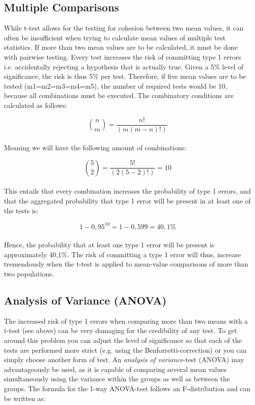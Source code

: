 \subsection{Multiple Comparisons}
While t-test allows for the testing for cohesion between two mean values, it can often be insufficient when trying to calculate mean values of multiple test statistics. If more than two mean values are to be calculated, it must be done with pairwise testing. Every test increases the risk of committing type 1 errors i.e. accidentally rejecting a hypothesis that is actually true. Given a 5\% level of significance, the risk is thus 5\% per test. Therefore, if five mean values are to be tested (m1=m2=m3=m4=m5), the number of required tests would be 10, because all combinations must be executed. The combinatory conditions are calculated as follows:

\begin{equation}
\binom{n}{m} = {\frac{n!}{(m(m-n)!)}} 
\end{equation}\\
Meaning we will have the following amount of combinations:

\begin{equation}
\binom{5}{2} = {\frac{5!}{(2(5-2)!)}} = 10 
\end{equation}\\
This entails that every combination increases the probability of type 1 errors, and that the aggregated probability that type 1 error will be present in at least one of the tests is:

\begin{equation}
1-0,95^{10}= 1-0,599 = 40,1\%
\end{equation}\\
Hence, the probability  that at least one type 1 error will be present is approximately 40,1\%. The risk of committing a type 1 error will thus, increase tremendously when the t-test is applied to mean-value comparisons of more than two populations.
\\

\subsection{Analysis of Variance (ANOVA)}
The increased risk of type 1 errors when comparing more than two means with a t-test (see above) can be very damaging for the credibility of any test. To get around this problem you can adjust the level of significance so that each of the tests are performed more strict (e.g. using the Benforretti-correction) or you can simply choose another form of test. An \textit{analysis of variance}-test (ANOVA) may advantageously be used, as it is capable of comparing several mean values simultaneously using the variance within the groups as well as between the groups.  The formula for the 1-way ANOVA-test follows an F-distribution and can be written as:\\

